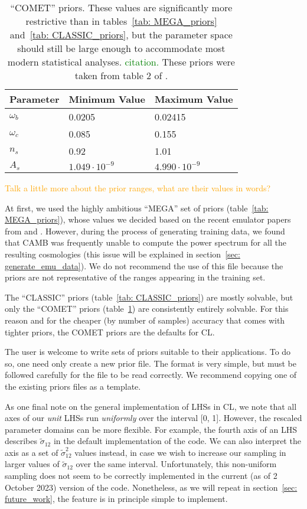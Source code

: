 \begin{table}[ht!]
\centering
\begin{tabular}{l|l|l}
\hline
Parameter & Minimum Value & Maximum Value \\ \hline
$\omega_b$ & 0.0205 & 0.02415 \\
$\omega_c$ & 0.085 & 0.155 \\
$n_s$ & 0.92 & 1.01 \\
$A_s$\footnotemark & $1.049 \cdot 10^{-9}$ & $4.990 \cdot 10^{-9}$  \\
\end{tabular}
	\cprotect\caption[``COMET'' priors]{``COMET'' priors.
	These values are significantly more restrictive than in
	tables~\ref{tab: MEGA_priors} and~\ref{tab: CLASSIC_priors},
	but the parameter space should still be large enough to accommodate
	most modern statistical analyses. \textcolor{green}{citation.}
	These priors were taken from table 2 of \citet{Eggemeier}.}
 \label{tab: COMET_priors}
\end{table}

\textcolor{orange}{Talk a little more about the prior ranges, what are their
values in words?}

At first, we used the highly ambitious ``MEGA'' set of priors
(table~\ref{tab: MEGA_priors}), whose values we decided based on the recent 
emulator papers from \citet{Mancini} and \citet{Arico}.
However, during the process of generating training data, 
we found that CAMB was frequently unable to compute the power spectrum for
all the
resulting cosmologies (this issue will be explained in
section~\ref{sec: generate_emu_data}). We do not recommend the use of this
file because the priors are not representative of the ranges appearing in the
training set.

The ``CLASSIC'' priors (table~\ref{tab: CLASSIC_priors}) are mostly solvable, 
but only the ``COMET'' priors (table~\ref{tab: COMET_priors}) are consistently
entirely solvable. For this reason and for the cheaper (by number of samples) 
accuracy that comes with tighter priors, the COMET priors are the defaults for 
CL.

The user is welcome to write sets of priors suitable to their applications.
To do so, one need only create a new prior file. The format is very simple, 
but must be followed carefully for the file to be read correctly. We
recommend copying one of the existing priors files as a template. 

As one final note on the general implementation of LHSs in CL, we note that
all axes of our \textit{unit} LHSs run \textit{uniformly} over the interval
[0, 1]. However, the rescaled 
parameter domains can be more flexible. For example, the fourth axis
of an LHS
describes $\tilde{\sigma}_{12}$ in the default implementation of the code. We can also
interpret the axis as a set of $\tilde{\sigma}_{12}^2$ values instead,
in case we wish to
increase our sampling in larger values of $\tilde{\sigma}_{12}$ over the same
interval. Unfortunately, this non-uniform sampling does not seem to be
correctly implemented
in the current (as of 2 October 2023) version of the code. Nonetheless, as we
will repeat in section~\ref{sec: future_work},
the feature is in principle simple to implement.

